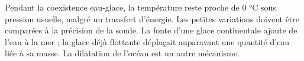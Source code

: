 \par\noindent\begin{minipage}{\linewidth}
\label{cor-activite-3}
Pendant la coexistence eau-glace, la température reste proche de 0 °C sous pression usuelle, malgré un transfert d’énergie. Les petites variations doivent être comparées à la précision de la sonde. La fonte d’une glace continentale ajoute de l’eau à la mer ; la glace déjà flottante déplaçait auparavant une quantité d’eau liée à sa masse. La dilatation de l’océan est un autre mécanisme.\par\end{minipage}
